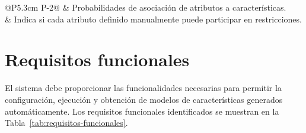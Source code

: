 \begin{longtable}{@{}P{5.3cm} P{\dimexpr\textwidth-5.3cm-2\tabcolsep\relax}@{}}
\midrule
{} & Probabilidades de asociación de atributos a características. \\

\midrule
{} & Indica si cada atributo definido manualmente puede participar en
restricciones. \\

\bottomrule
\caption{Atributos del requisito de información RI-07.}
\label{tab:ri-attributes-config}
\end{longtable}

\section{Requisitos funcionales}
\label{sec:rf}


El sistema debe proporcionar las funcionalidades necesarias para permitir la configuración, ejecución y obtención de modelos de características generados automáticamente. Los requisitos funcionales identificados se muestran en la Tabla~\ref{tab:requisitos-funcionales}.

